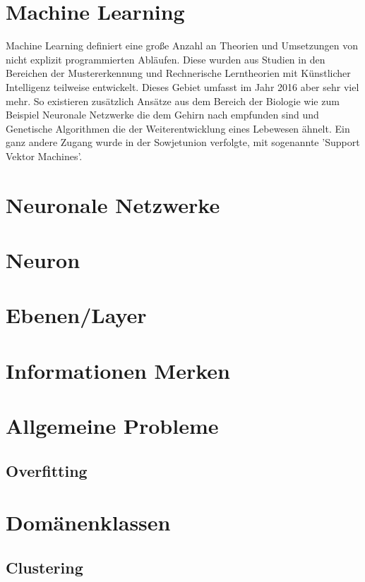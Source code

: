\section{Machine Learning}

Machine Learning definiert eine große Anzahl an Theorien und Umsetzungen von nicht explizit programmierten Abläufen. Diese wurden aus Studien in den Bereichen der Mustererkennung und Rechnerische Lerntheorien mit Künstlicher Intelligenz teilweise entwickelt. Dieses Gebiet umfasst im Jahr 2016 aber sehr viel mehr. So existieren zusätzlich Ansätze aus dem Bereich der Biologie wie zum Beispiel Neuronale Netzwerke die dem Gehirn nach empfunden sind und Genetische Algorithmen die der Weiterentwicklung eines Lebewesen ähnelt. Ein ganz andere Zugang wurde in der Sowjetunion verfolgte, mit sogenannte 'Support Vektor Machines'. 

\section{Neuronale Netzwerke}

\section{Neuron}

\section{Ebenen/Layer}

\section{Informationen Merken}

\section{Allgemeine Probleme}

\subsection{Overfitting}

\section{Domänenklassen}

\subsection{Clustering}

